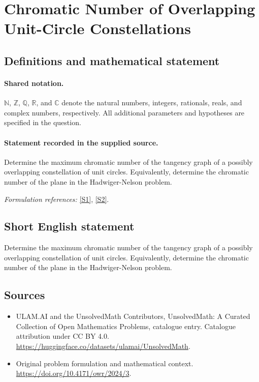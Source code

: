 \documentclass[11pt]{article}
\newcommand{\sref}[2]{\hyperlink{source:#1:#2}{[S#2]}}
\begin{document}
\section{Chromatic Number of Overlapping Unit-Circle Constellations}\label{statement}

\subsection{Definitions and mathematical statement}

\paragraph{Shared notation.}$\mathbb N$, $\mathbb Z$, $\mathbb Q$, $\mathbb R$, and $\mathbb C$ denote the natural numbers, integers, rationals, reals, and complex numbers, respectively. All additional parameters and hypotheses are specified in the question.


\paragraph{Statement recorded in the supplied source.}
Determine the maximum chromatic number of the tangency graph of a possibly overlapping constellation of unit circles. Equivalently, determine the chromatic number of the plane in the Hadwiger-Nelson problem.
\par\smallskip\textit{Formulation references:} \sref{statement}{1}, \sref{statement}{2}.
\subsection{Short English statement}
Determine the maximum chromatic number of the tangency graph of a possibly overlapping constellation of unit circles. Equivalently, determine the chromatic number of the plane in the Hadwiger-Nelson problem.
\subsection{Sources}
\begin{itemize}
\item[\hypertarget{source:statement:1}{S1}] ULAM.AI and the UnsolvedMath Contributors, UnsolvedMath: A Curated Collection of Open Mathematics Problems, catalogue entry. Catalogue attribution under CC BY 4.0.
\url{https://huggingface.co/datasets/ulamai/UnsolvedMath}.
\item[\hypertarget{source:statement:2}{S2}] Original problem formulation and mathematical context.
\url{https://doi.org/10.4171/owr/2024/3}.
\end{itemize}
\label{end:statement}
\end{document}
